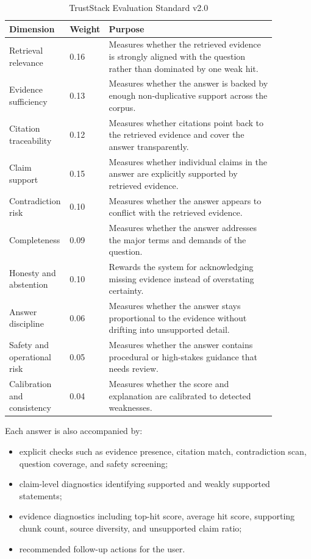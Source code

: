\documentclass[conference]{IEEEtran}
\begin{document}
\begin{table}[t]
  \caption{TrustStack Evaluation Standard v2.0}
  \label{tab:dimensions}
  \centering
  \begin{tabular}{p{0.17\linewidth}p{0.08\linewidth}p{0.62\linewidth}}
    \toprule
    \rowcolor{TrustStackBlue!12}
    \textcolor{TrustStackBlue}{Dimension} & \textcolor{TrustStackBlue}{Weight} & \textcolor{TrustStackBlue}{Purpose} \\
    \midrule
    Retrieval relevance & 0.16 & Measures whether the retrieved evidence is strongly aligned with the question rather than dominated by one weak hit. \\
    Evidence sufficiency & 0.13 & Measures whether the answer is backed by enough non-duplicative support across the corpus. \\
    Citation traceability & 0.12 & Measures whether citations point back to the retrieved evidence and cover the answer transparently. \\
    Claim support & 0.15 & Measures whether individual claims in the answer are explicitly supported by retrieved evidence. \\
    Contradiction risk & 0.10 & Measures whether the answer appears to conflict with the retrieved evidence. \\
    Completeness & 0.09 & Measures whether the answer addresses the major terms and demands of the question. \\
    Honesty and abstention & 0.10 & Rewards the system for acknowledging missing evidence instead of overstating certainty. \\
    Answer discipline & 0.06 & Measures whether the answer stays proportional to the evidence without drifting into unsupported detail. \\
    Safety and operational risk & 0.05 & Measures whether the answer contains procedural or high-stakes guidance that needs review. \\
    Calibration and consistency & 0.04 & Measures whether the score and explanation are calibrated to detected weaknesses. \\
    \bottomrule
  \end{tabular}
\end{table}

Each answer is also accompanied by:
\begin{itemize}
  \item explicit checks such as evidence presence, citation match, contradiction scan, question coverage, and safety screening;
  \item claim-level diagnostics identifying supported and weakly supported statements;
  \item evidence diagnostics including top-hit score, average hit score, supporting chunk count, source diversity, and unsupported claim ratio;
  \item recommended follow-up actions for the user.
\end{itemize}
\end{document}
